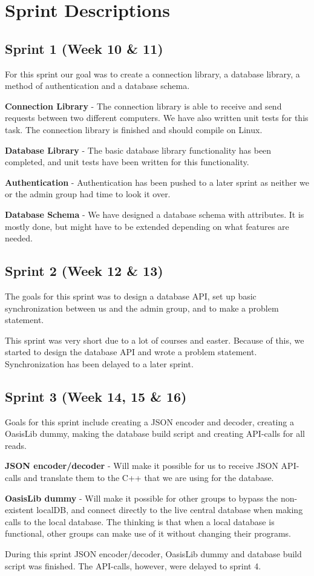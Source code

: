\section{Sprint Descriptions}
\subsection{Sprint 1 (Week 10 \& 11)}
For this sprint our goal was to create a connection library, a database library, a method of authentication and a database schema.

\textbf{Connection Library} - The connection library is able to receive and send requests between two different computers. We have also written unit tests for this task. The connection library is finished and should compile on Linux.

\textbf{Database Library} - The basic database library functionality has been completed, and unit tests have been written for this functionality.

\textbf{Authentication} - Authentication has been pushed to a later sprint as neither we or the admin group had time to look it over.

\textbf{Database Schema} - We have designed a database schema with attributes. It is mostly done, but might have to be extended depending on what features are needed.

\subsection{Sprint 2 (Week 12 \& 13)}
The goals for this sprint was to design a database API, set up basic synchronization between us and the admin group, and to make a problem statement.

This sprint was very short due to a lot of courses and easter. Because of this, we started to design the database API and wrote a problem statement. Synchronization has been delayed to a later sprint.

\subsection{Sprint 3 (Week 14, 15 \& 16)}
Goals for this sprint include creating a JSON encoder and decoder, creating a OasisLib dummy, making the database build script and creating API-calls for all reads.

\textbf{JSON encoder/decoder} - Will make it possible for us to receive JSON API-calls and translate them to the C++ that we are using for the database.

\textbf{OasisLib dummy} - Will make it possible for other groups to bypass the non-existent localDB, and connect directly to the live central database when making calls to the local database. The thinking is that when a local database is functional, other groups can make use of it without changing their programs.

During this sprint JSON encoder/decoder, OasisLib dummy and database build script was finished. The API-calls, however, were delayed to sprint 4.